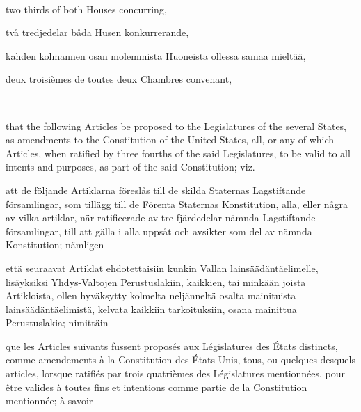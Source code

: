 \documentclass[a4paper,landscape,12pt]{article}
\begin{document}
~

\begin{minipage}[t]{0.22\textwidth}
two thirds of both Houses concurring,
\end{minipage}\textwidth
\begin{minipage}[t]{0.22\textwidth}
två tredjedelar båda Husen konkurrerande,
\end{minipage}\textwidth
\begin{minipage}[t]{0.22\textwidth}
kahden kolmannen osan molemmista Huoneista ollessa samaa mieltää,
\end{minipage}\textwidth
\begin{minipage}[t]{0.22\textwidth}
deux troisièmes de toutes deux Chambres convenant,
\end{minipage}

~

\begin{minipage}[t]{0.22\textwidth}
that the following Articles be proposed to the Legislatures of the several States, as amendments to the Constitution of the United States, all, or any of which Articles, when ratified by three fourths of the said Legislatures, to be valid to all intents and purposes, as part of the said Constitution; viz.
\end{minipage}\textwidth
\begin{minipage}[t]{0.22\textwidth}
att de följande Artiklarna föreslås till de skilda Staternas Lagstiftande församlingar, som tillägg till de Förenta Staternas Konstitution, alla, eller några av vilka artiklar, när ratificerade av tre fjärdedelar nämnda Lagstiftande församlingar, till att gälla i alla uppsåt och avsikter som del av nämnda Konstitution; nämligen
\end{minipage}\textwidth
\begin{minipage}[t]{0.22\textwidth}
että seuraavat Artiklat ehdotettaisiin kunkin Vallan lainsäädäntäelimelle, lisäyksiksi Yhdys-Valtojen Perustuslakiin, kaikkien, tai minkään joista Artikloista, ollen hyväksytty kolmelta neljänneltä osalta mainituista lainsäädäntäelimistä, kelvata kaikkiin tarkoituksiin, osana mainittua Perustuslakia; nimittäin
\end{minipage}\textwidth
\begin{minipage}[t]{0.22\textwidth}
que les Articles suivants fussent proposés aux Législatures des États distincts, comme amendements à la Constitution des États-Unis, tous, ou quelques desquels articles, lorsque ratifiés par trois quatrièmes des Législatures mentionnées, pour être valides à toutes fins et intentions comme partie de la Constitution mentionnée; à savoir
\end{minipage}
~
\end{document}
